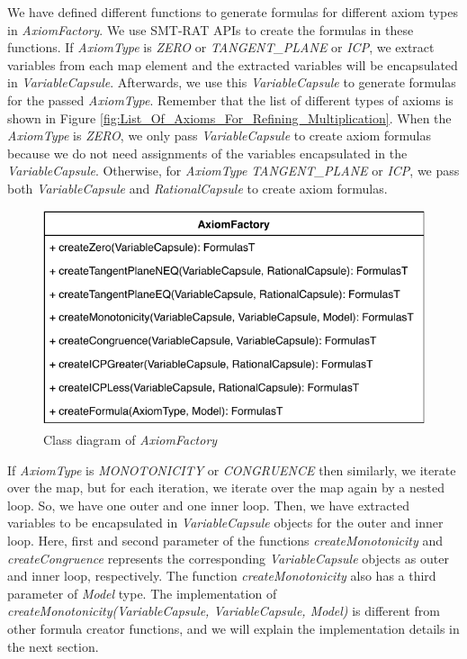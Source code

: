 \noindent We have defined different functions to generate formulas for different axiom types in \textit{AxiomFactory}.
We use SMT-RAT APIs to create the formulas in these functions.
If \textit{AxiomType} is \textit{ZERO} or \textit{TANGENT\_PLANE} or \textit{ICP}, we extract variables from each map element and the extracted variables will be encapsulated in \textit{VariableCapsule}.
Afterwards, we use this \textit{VariableCapsule} to generate formulas for the passed \textit{AxiomType}.
Remember that the list of different types of axioms is shown in Figure \ref{fig:List_Of_Axioms_For_Refining_Multiplication}.
When the \textit{AxiomType} is \textit{ZERO}, we only pass \textit{VariableCapsule} to create axiom formulas because we do not need assignments of the variables encapsulated in the \textit{VariableCapsule}.
Otherwise, for \textit{AxiomType} \textit{TANGENT\_PLANE} or \textit{ICP}, we pass both \textit{VariableCapsule} and \textit{RationalCapsule} to create axiom formulas.\newline

\begin{figure}[ht!]
  \centering
  \includegraphics[width=0.6\linewidth]{./figures/AxiomFactoryClassDiagram.pdf}
  \caption{Class diagram of \textit{AxiomFactory}}
  \label{fig:class_diagram_of_AxiomFactory}
\end{figure}

\noindent If \textit{AxiomType} is \textit{MONOTONICITY} or \textit{CONGRUENCE} then similarly, we iterate over the map, but for each iteration, we iterate over the map again by a nested loop.
So, we have one outer and one inner loop.
Then, we have extracted variables to be encapsulated in \textit{VariableCapsule} objects for the outer and inner loop.
Here, first and second parameter of the functions \textit{createMonotonicity} and \textit{createCongruence} represents the  corresponding \textit{VariableCapsule} objects as outer and inner loop, respectively.
The function \textit{createMonotonicity} also has a third parameter of \textit{Model} type.
The implementation of \textit{createMonotonicity(VariableCapsule, VariableCapsule, Model)} is different from other formula creator functions, and we will explain the implementation details in the next section.

